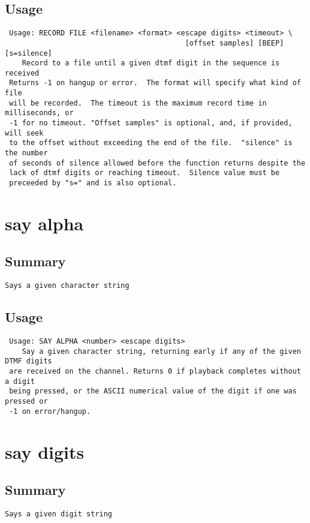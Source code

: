 \subsection{Usage}
\begin{verbatim}
 Usage: RECORD FILE <filename> <format> <escape digits> <timeout> \
                                          [offset samples] [BEEP] [s=silence]
	Record to a file until a given dtmf digit in the sequence is received
 Returns -1 on hangup or error.  The format will specify what kind of file
 will be recorded.  The timeout is the maximum record time in milliseconds, or
 -1 for no timeout. "Offset samples" is optional, and, if provided, will seek
 to the offset without exceeding the end of the file.  "silence" is the number
 of seconds of silence allowed before the function returns despite the
 lack of dtmf digits or reaching timeout.  Silence value must be
 preceeded by "s=" and is also optional.

\end{verbatim}


\section{say alpha}
\subsection{Summary}
\begin{verbatim}
Says a given character string
\end{verbatim}
\subsection{Usage}
\begin{verbatim}
 Usage: SAY ALPHA <number> <escape digits>
	Say a given character string, returning early if any of the given DTMF digits
 are received on the channel. Returns 0 if playback completes without a digit
 being pressed, or the ASCII numerical value of the digit if one was pressed or
 -1 on error/hangup.

\end{verbatim}


\section{say digits}
\subsection{Summary}
\begin{verbatim}
Says a given digit string
\end{verbatim}
